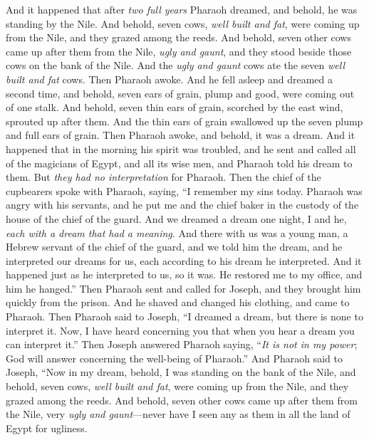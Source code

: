 \begin{biblechapter} %
 And it happened that after \textit{two full years} Pharaoh dreamed, and behold, he was standing by the Nile.
\verse And behold, seven cows, \textit{well built and fat}, were coming up from the Nile, and they grazed among the reeds.
\verse And behold, seven other cows came up after them from the Nile, \textit{ugly and gaunt}, and they stood beside those cows on the bank of the Nile.
\verse And the \textit{ugly and gaunt} cows ate the seven \textit{well built and fat} cows. Then Pharaoh awoke.
\verse And he fell asleep and dreamed a second time, and behold, seven ears of grain, plump and good, were coming out of one stalk.
\verse And behold, seven thin ears of grain, scorched by the east wind, sprouted up after them.
\verse And the thin ears of grain swallowed up the seven plump and full ears of grain. Then Pharaoh awoke, and behold, it was a dream.
\verse And it happened that in the morning his spirit was troubled, and he sent and called all of the magicians of Egypt, and all its wise men, and Pharaoh told his dream to them. But \textit{they had no interpretation} for Pharaoh.
\verse Then the chief of the cupbearers spoke with Pharaoh, saying, “I remember my sins today.
\verse Pharaoh was angry with his servants, and he put me and the chief baker in the custody of the house of the chief of the guard.
\verse And we dreamed a dream one night, I and he, \textit{each with a dream that had a meaning}.
\verse And there with us was a young man, a Hebrew servant of the chief of the guard, and we told him the dream, and he interpreted our dreams for us, each according to his dream he interpreted.
\verse And it happened just as he interpreted to us, so it was. He restored me to my office, and him he hanged.”
\verse Then Pharaoh sent and called for Joseph, and they brought him quickly from the prison. And he shaved and changed his clothing, and came to Pharaoh.
\verse Then Pharaoh said to Joseph, “I dreamed a dream, but there is none to interpret it. Now, I have heard concerning you that when you hear a dream you can interpret it.”
\verse Then Joseph answered Pharaoh saying, “\textit{It is not in my power}; God will answer concerning the well-being of Pharaoh.”
\verse And Pharaoh said to Joseph, “Now in my dream, behold, I was standing on the bank of the Nile,
\verse and behold, seven cows, \textit{well built and fat}, were coming up from the Nile, and they grazed among the reeds.
\verse And behold, seven other cows came up after them from the Nile, very \textit{ugly and gaunt}—never have I seen any as them in all the land of Egypt for ugliness.

\end{biblechapter}
